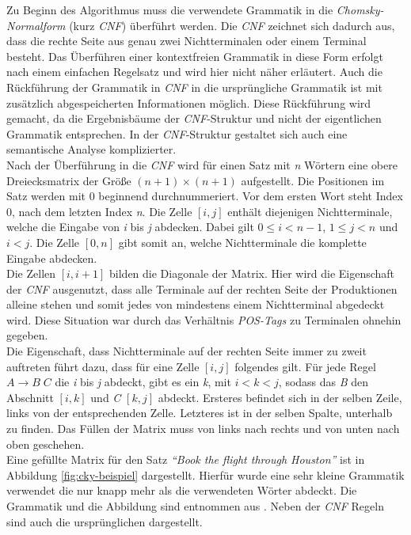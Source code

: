Zu Beginn des Algorithmus muss die verwendete Grammatik in die \textit{Chomsky-Normalform} (kurz \textit{CNF}) überführt werden. Die \textit{CNF} zeichnet sich dadurch aus, dass die rechte Seite aus genau zwei Nichtterminalen oder einem Terminal besteht. Das Überführen einer kontextfreien Grammatik in diese Form erfolgt nach einem einfachen Regelsatz und wird hier nicht näher erläutert. Auch die Rückführung der Grammatik in \textit{CNF} in die ursprüngliche Grammatik ist mit zusätzlich abgespeicherten Informationen möglich. Diese Rückführung wird gemacht, da die Ergebnisbäume der \textit{CNF}-Struktur und nicht der eigentlichen Grammatik entsprechen. In der \textit{CNF}-Struktur gestaltet sich auch eine semantische Analyse komplizierter. \\
Nach der Überführung in die \textit{CNF} wird für einen Satz mit \textit{n} Wörtern eine obere Dreiecksmatrix der Größe \((n+1) \times (n+1) \) aufgestellt. Die Positionen im Satz werden mit 0 beginnend durchnummeriert. Vor dem ersten Wort steht Index 0, nach dem letzten Index \textit{n}. Die Zelle \([i, j]\) enthält diejenigen Nichtterminale, welche die Eingabe von \textit{i} bis \textit{j} abdecken. Dabei gilt \( 0 \leq i < n-1 \), \( 1 \leq j < n \) und \(i < j\). Die Zelle \([0, n]\) gibt somit an, welche Nichtterminale die komplette Eingabe abdecken.\\
Die Zellen \([i, i+1]\) bilden die Diagonale der Matrix. Hier wird die Eigenschaft der \textit{CNF} ausgenutzt, dass alle Terminale auf der rechten Seite der Produktionen alleine stehen und somit jedes von mindestens einem Nichtterminal abgedeckt wird. Diese Situation war durch das Verhältnis \textit{POS-Tags} zu Terminalen ohnehin gegeben.\\
Die Eigenschaft, dass Nichtterminale auf der rechten Seite immer zu zweit auftreten führt dazu, dass für eine Zelle \([i, j]\) folgendes gilt. Für jede Regel \( A \to B\;C \) die \textit{i} bis \textit{j} abdeckt, gibt es ein \textit{k}, mit \( i < k < j\), sodass das \textit{B} den Abschnitt \([i, k]\) und \textit{C} \([k, j]\) abdeckt. Ersteres befindet sich in der selben Zeile, links von der entsprechenden Zelle. Letzteres ist in der selben Spalte, unterhalb zu finden. Das Füllen der Matrix muss von links nach rechts und von unten nach oben geschehen.\\
Eine gefüllte Matrix für den Satz \textit{``Book the flight through Houston''} ist in Abbildung \ref{fig:cky-beispiel} dargestellt. Hierfür wurde eine sehr kleine Grammatik verwendet die nur knapp mehr als die verwendeten Wörter abdeckt. Die Grammatik und die Abbildung sind entnommen aus \cite[Kapitel 11]{nlpGrundlagen}. Neben der \textit{CNF} Regeln sind auch die ursprünglichen dargestellt.

